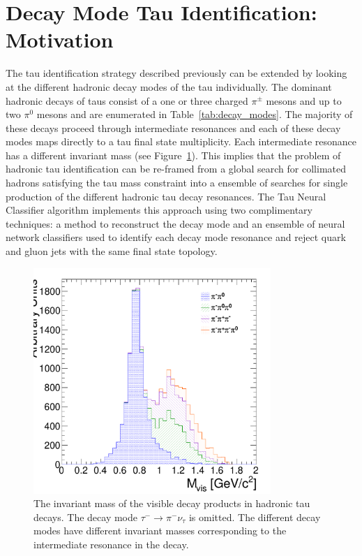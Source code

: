 \section{Decay Mode Tau Identification: Motivation}
%
The tau identification strategy described previously can be extended by
looking at the different hadronic decay modes of the tau individually.
The dominant hadronic decays of taus consist of a one or three charged
$\pi^{\pm}$ mesons and up to two $\pi^0$ mesons and are enumerated in
Table~\ref{tab:decay_modes}.  The majority of these decays proceed through
intermediate resonances and each of these decay modes maps directly to a tau
final state multiplicity. Each intermediate resonance has a different invariant
mass (see Figure~\ref{fig:trueInvMass}).  This implies that the problem of
hadronic tau identification can be re-framed from a global search for
collimated hadrons satisfying the tau mass constraint into a ensemble of
searches for single production of the different hadronic tau decay resonances.
The Tau Neural Classifier algorithm implements this approach using two
complimentary techniques: a method to reconstruct the decay mode and an
ensemble of neural network classifiers used to identify each decay mode
resonance and reject quark and gluon jets with the same final state topology.

\begin{figure}[thbp]
   \begin{center}
     \includegraphics[width=90mm]{tanc_chapter/figures/truthIMvsDM.pdf}
   \end{center}
   \caption[Visible invariant mass of $\tau$ lepton decay products]{The
   invariant mass of the visible decay products in hadronic tau decays.  The
   decay mode $\tau^{-} \to \pi^{-} \nu_\tau$ is omitted.  The different decay
   modes have different invariant masses corresponding to the intermediate
   resonance in the decay.} \label{fig:trueInvMass}
\end{figure}

